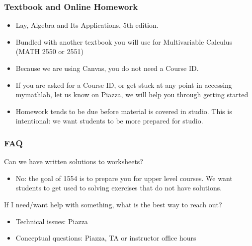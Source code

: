 \documentclass[xcolor=table,11pt,notes=hide,t,handout]{beamer}
\begin{document}



\begin{frame}\frametitle{Textbook and Online Homework}

    \begin{itemize}
        \item Lay, Algebra and Its Applications, 5th edition. 
        \item Bundled with another textbook you will use for Multivariable Calculus (MATH 2550 or 2551)
        \item Because we are using Canvas, you do not need a Course ID. 
        \item If you are asked for a Course ID, or get stuck at any point in accessing mymathlab, let us know on Piazza, we will help you through getting started 
        \item Homework tends to be due before material is covered in studio. This is intentional: we want students to be more prepared for studio. 
    \end{itemize}

\end{frame}








\begin{frame}\frametitle{FAQ}

    Can we have written solutions to worksheets? 
    \begin{itemize}
        \item No: the goal of 1554 is to prepare you for upper level courses. We want students to get used to solving exercises that do not have solutions. 
    \end{itemize}
    If I need/want help with something, what is the best way to reach out? 
    \begin{itemize}
        \item Technical issues: Piazza
        \item Conceptual questions: Piazza, TA or instructor office hours
    \end{itemize}

\end{frame}
\end{document}

